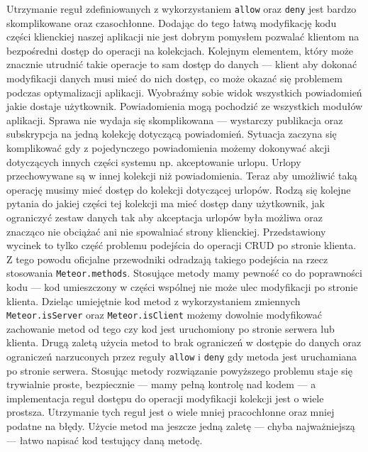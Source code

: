 Utrzymanie reguł zdefiniowanych z wykorzystaniem \verb|allow| oraz \verb|deny| jest bardzo skomplikowane oraz czasochłonne. Dodając do tego łatwą modyfikację kodu części klienckiej naszej aplikacji nie jest dobrym pomysłem pozwalać klientom na bezpośredni dostęp do operacji na kolekcjach. Kolejnym elementem, który może znacznie utrudnić takie operacje to sam dostęp do danych --- klient aby dokonać modyfikacji danych musi mieć do nich dostęp, co może okazać się problemem podczas optymalizacji aplikacji. Wyobraźmy sobie widok wszystkich powiadomień jakie dostaje użytkownik. Powiadomienia mogą pochodzić ze wszystkich modułów aplikacji. Sprawa nie wydaja się skomplikowana --- wystarczy publikacja oraz subskrypcja na jedną kolekcję dotyczącą powiadomień. Sytuacja zaczyna się komplikować gdy z pojedynczego powiadomienia możemy dokonywać akcji dotyczących innych części systemu np. akceptowanie urlopu. Urlopy przechowywane są w innej kolekcji niż powiadomienia. Teraz aby umożliwić taką operację musimy mieć dostęp do kolekcji dotyczącej urlopów. Rodzą się kolejne pytania do jakiej części tej kolekcji ma mieć dostęp dany użytkownik, jak ograniczyć zestaw danych tak aby akceptacja urlopów była możliwa oraz znacząco nie obciążać ani nie spowalniać strony klienckiej. Przedstawiony wycinek to tylko część problemu podejścia do operacji CRUD po stronie klienta. Z tego powodu oficjalne przewodniki odradzają takiego podejścia na rzecz stosowania \verb|Meteor.methods|. Stosujące metody mamy pewność co do poprawności kodu --- kod umieszczony w części wspólnej nie może ulec modyfikacji po stronie klienta. Dzieląc umiejętnie kod metod z wykorzystaniem zmiennych \verb|Meteor.isServer| oraz \verb|Meteor.isClient| możemy dowolnie modyfikować zachowanie metod od tego czy kod jest uruchomiony po stronie serwera lub klienta. Drugą zaletą użycia metod to brak ograniczeń w dostępie do danych oraz ograniczeń narzuconych przez reguły \verb|allow| i \verb|deny| gdy metoda jest uruchamiana po stronie serwera. Stosując metody rozwiązanie powyższego problemu staje się trywialnie proste, bezpiecznie --- mamy pełną kontrolę nad kodem --- a implementacja reguł dostępu do operacji modyfikacji kolekcji jest o wiele prostsza. Utrzymanie tych reguł jest o wiele mniej pracochłonne oraz mniej podatne na błędy. Użycie metod ma jeszcze jedną zaletę --- chyba najważniejszą --- łatwo napisać kod testujący daną metodę.

